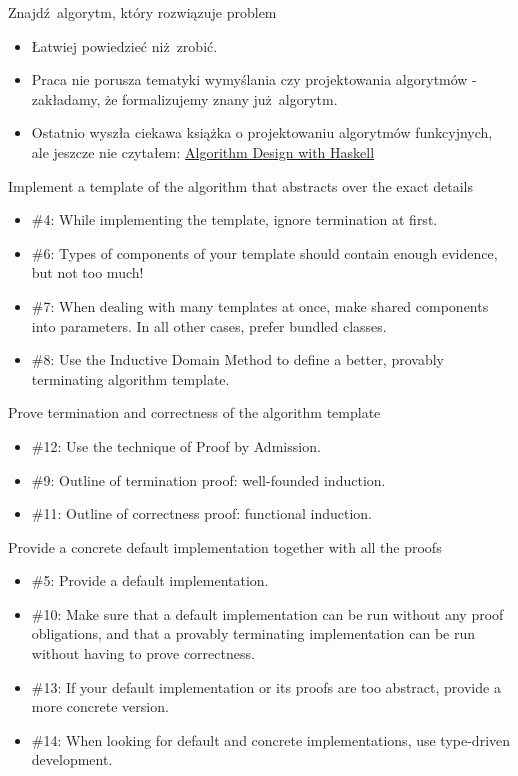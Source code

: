 \documentclass{beamer}
\begin{document}
\begin{frame}{Znajdź algorytm, który rozwiązuje problem}
\begin{itemize}
	\item Łatwiej powiedzieć niż zrobić.
	\item Praca nie porusza tematyki wymyślania czy projektowania algorytmów - zakładamy, że formalizujemy znany już algorytm.
	\item Ostatnio wyszła ciekawa książka o projektowaniu algorytmów funkcyjnych, ale jeszcze nie czytałem: \href{https://www.amazon.com/Algorithm-Design-Haskell-Richard-Bird/dp/1108491618}{Algorithm Design with Haskell}
\end{itemize}
\end{frame}

\begin{frame}{Implement a template of the algorithm that abstracts over the exact details}
\begin{itemize}
	\item \#4: While implementing the template, ignore termination at first.
	\item \#6: Types of components of your template should contain enough evidence, but not too much!
	\item \#7: When dealing with many templates at once, make shared components into parameters. In all other cases, prefer bundled classes.
	\item \#8: Use the Inductive Domain Method to define a better, provably terminating algorithm template.
\end{itemize}
\end{frame}

\begin{frame}{Prove termination and correctness of the algorithm template}
\begin{itemize}
	\item \#12: Use the technique of Proof by Admission.
	\item \#9: Outline of termination proof: well-founded induction.
	\item \#11: Outline of correctness proof: functional induction.
\end{itemize}
\end{frame}


\begin{frame}{Provide a concrete default implementation together with all the proofs}
\begin{itemize}
	\item \#5: Provide a default implementation.
	\item \#10: Make sure that a default implementation can be run without any proof obligations, and that a provably terminating implementation can be run without having to prove correctness.
	\item \#13: If your default implementation or its proofs are too abstract, provide a more concrete version.
	\item \#14: When looking for default and concrete implementations, use type-driven development.
\end{itemize}
\end{frame}
\end{document}
